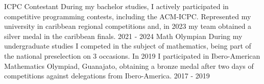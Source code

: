 \begin{cvawards}
    \cvaward
      {ICPC Contestant}
      {During my bachelor studies, I actively participated in competitive programming contests, including the ACM-ICPC. 
      Represented my university in caribbean regional competitions and, in 2023 my team obtained a silver medal in 
      the caribbean finals.}
      {2021 - 2024}
      {}
  \cvaward
    {Math Olympian}
    {During my undergraduate studies I competed in the subject of mathematics, being part of the national preselection on 3 occasions.
    In 2019 I participated in Ibero-American Mathematics Olympiad, Guanajato, obtaining a bronze medal 
    after two days of competitions against delegations from Ibero-America.}
    {2017 - 2019}
    {}
\end{cvawards}
